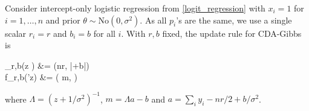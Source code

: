 \documentclass[twoside,11pt]{article}
\newcommand{\be}{\begin{equs}}
\newcommand{\ee}{\end{equs}}
\newcommand{\mc}[1]{\mathcal{#1}}
\newcommand{\No}{\text{No}}
\newcommand{\PG}{\text{PG}}
\newcommand{\Bern}{\text{Bernoulli}}
\newcommand{\1}{\mathbf 1}
\begin{document}
{%
%
%
%
%
%
%
Consider intercept-only logistic regression
from \eqref{logit_regression} with $x_i =1$ for $i=1,\ldots,n$ and prior $\theta\sim \No(0, \sigma^2)$.
As all $p_i$'s are the same, we use a single scalar $r_i=r$  and $b_i=b$ for all $i$. With $r,b$ fixed, the update rule for CDA-Gibbs is
    \be
    \pi_{r,b}(z \mid \theta) &= {\PG}(nr, |\theta+b|) \\
    f_{r,b}(\theta'\mid z) &= \No(  m, \Lambda  )
    \ee
where $ \Lambda= { ( z + 1/\sigma^2)}^{-1} $, $m = \Lambda a -b$ and $a= \sum_i y_i - nr/2 +b/\sigma^2$.

}
\end{document}
